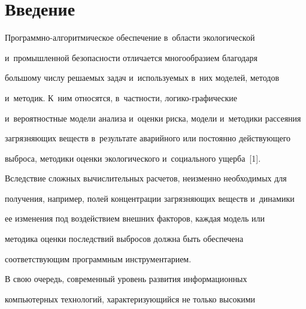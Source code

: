 




\vspace*{-6pt}













      \thispagestyle{headings}


  


  \section{Введение}


  


  Программно-алгоритмическое обеспечение в~области экологической 


и~промышленной безопасности отличается многообразием благодаря 


большому числу решаемых задач и~используемых в~них моделей, методов 


и~методик. К~ним относятся, в~частности, ло\-ги\-ко-гра\-фи\-че\-ские 


и~вероятностные модели анализа и~оценки риска, модели и~методики рассеяния 


загрязняющих веществ в~результате аварийного или постоянно действующего 


выброса, методики оценки экологического и~социального ущерба~[1]. 


Вследствие сложных вычислительных расчетов, неизменно необходимых для 


получения, например, полей концентрации загрязняющих веществ и~динамики 


ее изменения под воздействием внешних факторов, каждая модель или 


методика оценки последствий выбросов должна быть обеспечена 


соответствующим программным инструментарием.


  


  В свою очередь, современный уровень развития информационных 


компьютерных технологий, характеризующийся не только высокими 


